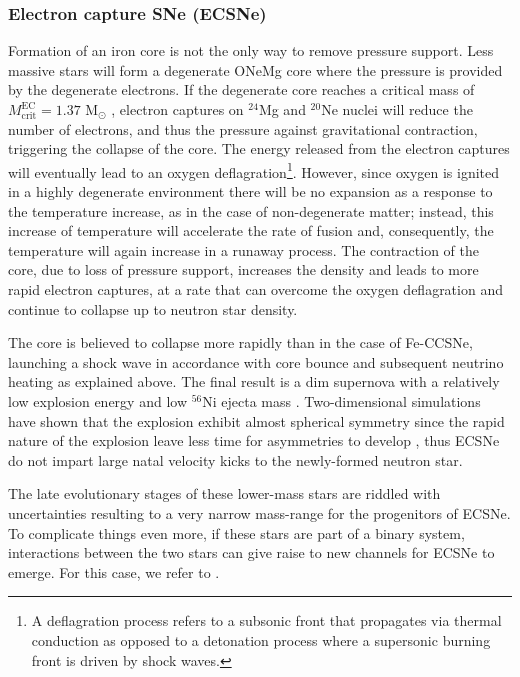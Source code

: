 \documentclass[../../main/thesis_msc.tex]{subfiles}
\begin{document}
				\subsubsection{Electron capture SNe (ECSNe)}
				
					Formation of an iron core is not the only way to remove pressure support. Less massive stars will form a degenerate ONeMg core where the pressure is provided by the degenerate electrons. If the degenerate core reaches a critical mass of $M^{\text{EC}}_{\text{crit}} = 1.37$ M$_{\odot}$ \citep{Nomoto1984}, electron captures on $^{24}$Mg and $^{20}$Ne nuclei will reduce the number of electrons, and thus the pressure against gravitational contraction, triggering the collapse of the core. The energy released from the electron captures will eventually lead to an oxygen deflagration\footnote{A deflagration process refers to a subsonic front that propagates via thermal conduction as opposed to a detonation process where a supersonic burning front is driven by shock waves.}. However, since oxygen is ignited in a highly degenerate environment there will be no expansion as a response to the temperature increase, as in the case of non-degenerate matter; instead, this increase of temperature will accelerate the rate of fusion and, consequently, the temperature will again increase in a runaway process. The contraction of the core, due to loss of pressure support, increases the density and leads to more rapid electron captures, at a rate that can overcome the oxygen deflagration and continue to collapse up to neutron star density.
					
					The core is believed to collapse more rapidly than in the case of Fe-CCSNe, launching a shock wave in accordance with core bounce and subsequent neutrino heating as explained above. The final result is a dim supernova with a relatively low explosion energy and low $^{56}$Ni ejecta mass \citep{Jones2016}. Two-dimensional simulations have shown that the explosion exhibit almost spherical symmetry \citep{Nomoto2014} since the rapid nature of the explosion leave less time for asymmetries to develop \citep{Jones2016}, thus ECSNe do not impart large natal velocity kicks to the newly-formed neutron star.
					
					The late evolutionary stages of these lower-mass stars are riddled with uncertainties resulting to a very narrow mass-range for the progenitors of ECSNe. To complicate things even more, if these stars are part of a binary system, interactions between the two stars can give raise to new channels for ECSNe to emerge. For this case, we refer to \cite{Siess2018, Giacobbo2018, Poelarends2017}.
 				
\end{document}
